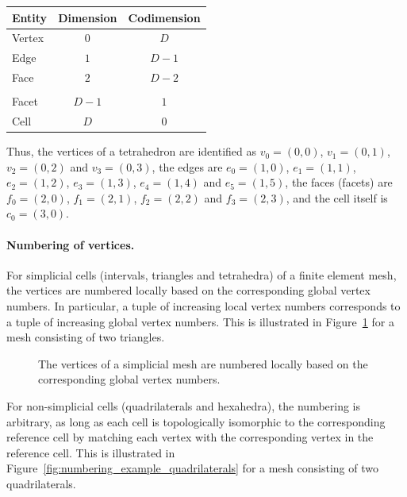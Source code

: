 \vspace{0.5cm}
\begin{center}
  \begin{tabular}{lcc}
    \toprule
    Entity & Dimension & Codimension \\
    \hline
    Vertex & $0$ & $D$ \\
    Edge & $1$ & $D-1$ \\
    Face & $2$ & $D-2$ \\
    & & \\
    Facet & $D-1$ & $1$ \\
    Cell & $D$ & $0$ \\
    \bottomrule
  \end{tabular}
\end{center}
\vspace{0.5cm}

Thus, the vertices of a tetrahedron are identified as $v_0 = (0, 0)$,
$v_1 = (0, 1)$, $v_2 = (0, 2)$ and $v_3 = (0, 3)$, the edges are $e_0
= (1, 0)$, $e_1 = (1, 1)$, $e_2 = (1, 2)$, $e_3 = (1, 3)$, $e_4 = (1,
4)$ and $e_5 = (1, 5)$, the faces (facets) are $f_0 = (2, 0)$, $f_1 =
(2, 1)$, $f_2 = (2, 2)$ and $f_3 = (2, 3)$, and the cell itself is
$c_0 = (3, 0)$.

\paragraph{Numbering of vertices.}

For simplicial cells (intervals, triangles and tetrahedra) of a finite
element mesh, the vertices are numbered locally based on the
corresponding global vertex numbers. In particular, a tuple of
increasing local vertex numbers corresponds to a tuple of increasing
global vertex numbers. This is illustrated in
Figure~\ref{fig:numbering_example_triangles} for a mesh consisting of
two triangles.

\begin{figure}
\bwfig
  \begin{center}
    \caption{The vertices of a simplicial mesh are numbered locally
      based on the corresponding global vertex numbers.}
    \label{fig:numbering_example_triangles}
  \end{center}
\end{figure}

For non-simplicial cells (quadrilaterals and hexahedra), the numbering
is arbitrary, as long as each cell is topologically isomorphic to the corresponding
reference cell by matching each vertex with the corresponding vertex
in the reference cell. This is illustrated in
Figure~\ref{fig:numbering_example_quadrilaterals} for a mesh
consisting of two quadrilaterals.

